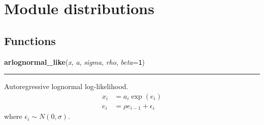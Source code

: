 %
%
%


\section{Module distributions}

    \label{distributions}


  \subsection{Functions}

    \label{pymc:distributions:arlognormal_like}

    \vspace{0.5ex}

\hspace{.8\funcindent}\begin{boxedminipage}{\funcwidth}

    \raggedright \textbf{arlognormal\_like}(\textit{x}, \textit{a}, \textit{sigma}, \textit{rho}, \textit{beta}={\tt 1})

    \vspace{-1.5ex}

    \rule{\textwidth}{0.5\fboxrule}
\setlength{\parskip}{2ex}

Autoregressive lognormal log-likelihood.
\begin{equation*}\begin{split}x_i & = a_i \exp(e_i) \\e_i & = \rho e_{i-1} + \epsilon_i\end{split}\end{equation*}
where $\epsilon_i \sim N(0,\sigma)$.
\setlength{\parskip}{1ex}
    \end{boxedminipage}

    \label{pymc:distributions:bernoulli_like}

